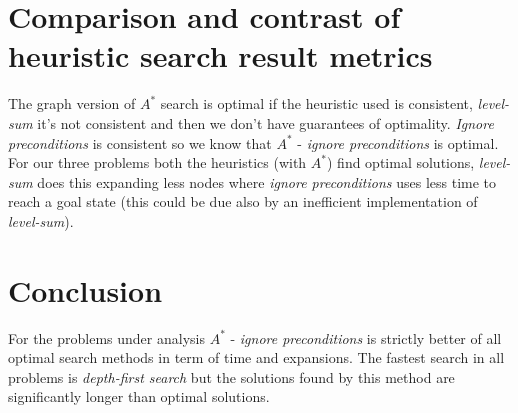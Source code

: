 \documentclass[10pt,a4paper]{article}
\begin{document}
\section{Comparison and contrast of heuristic search result metrics}

\begin{table}
\caption{Comparison and contrast of heuristic search result metrics.}\label{tab:heu}
\end{table}

The graph version of $A^{*}$ search is optimal if the heuristic used is consistent, \textit{level-sum} it's not consistent and then we don't have 
guarantees of optimality. \emph{Ignore preconditions} is consistent so we know that $A^{*}$ - \emph{ignore preconditions} is optimal. For our three problems both the heuristics (with $A^{*}$) find optimal solutions, \emph{level-sum} does this expanding less nodes where \emph{ignore preconditions} uses less time to reach a goal state (this could be due also by an inefficient implementation of \emph{level-sum}).

\section{Conclusion}

For the problems under analysis $A^{*}$ - \emph{ignore preconditions} is  strictly better of all optimal search methods in term of time and expansions. The fastest search in all problems is \emph{depth-first search} but the solutions found by this method are significantly longer than optimal solutions.
\end{document}

